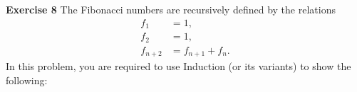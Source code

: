 \documentclass[12pt,oneside]{exam}
\newenvironment{exercise}[1]{\vspace{.1in}\noindent\textbf{Exercise #1 \hspace{.05em}}}{}
\begin{document}
\begin{exercise}{8}
The Fibonacci numbers are recursively defined by the relations
\begin{align*}
f_1 & =1,\\
f_2 & = 1,\\
f_{n+2} &=f_{n+1}+f_{n}.
\end{align*}
In this problem, you are required to use Induction (or its variants) to show the following:
\end{exercise}
\end{document}
